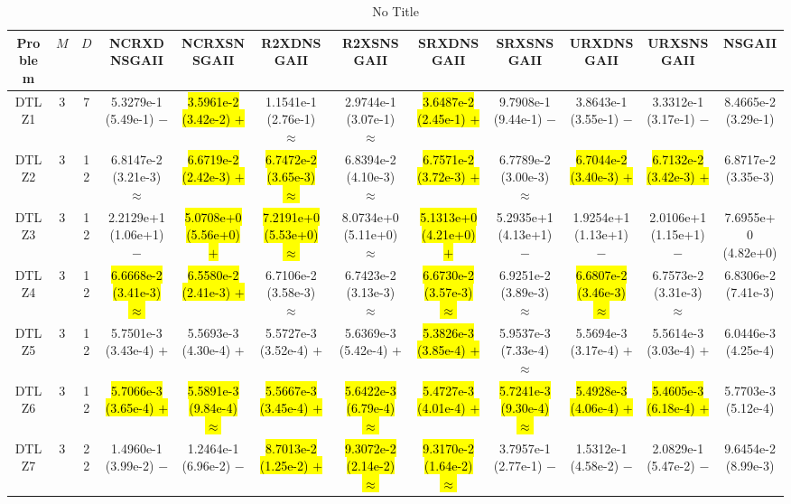 \documentclass[journal]{IEEEtran}
\begin{document}
\begin{table*}[htbp]
\renewcommand{\arraystretch}{1.2}
\centering
\caption{No Title}
\begin{tabular}{cccccccccccc}
\toprule
Problem&$M$&$D$&NCRXDNSGAII&NCRXSNSGAII&R2XDNSGAII&R2XSNSGAII&SRXDNSGAII&SRXSNSGAII&URXDNSGAII&URXSNSGAII&NSGAII\\
\midrule
\multirow{1}{*}{DTLZ1}&3&7&5.3279e-1 (5.49e-1) $-$&\hl{3.5961e-2 (3.42e-2) $+$}&1.1541e-1 (2.76e-1) $\approx$&2.9744e-1 (3.07e-1) $\approx$&\hl{3.6487e-2 (2.45e-1) $+$}&9.7908e-1 (9.44e-1) $-$&3.8643e-1 (3.55e-1) $-$&3.3312e-1 (3.17e-1) $-$&8.4665e-2 (3.29e-1)\\
\hline
\multirow{1}{*}{DTLZ2}&3&12&6.8147e-2 (3.21e-3) $\approx$&\hl{6.6719e-2 (2.42e-3) $+$}&\hl{6.7472e-2 (3.65e-3) $\approx$}&6.8394e-2 (4.10e-3) $\approx$&\hl{6.7571e-2 (3.72e-3) $+$}&6.7789e-2 (3.00e-3) $\approx$&\hl{6.7044e-2 (3.40e-3) $+$}&\hl{6.7132e-2 (3.42e-3) $+$}&6.8717e-2 (3.35e-3)\\
\hline
\multirow{1}{*}{DTLZ3}&3&12&2.2129e+1 (1.06e+1) $-$&\hl{5.0708e+0 (5.56e+0) $+$}&\hl{7.2191e+0 (5.53e+0) $\approx$}&8.0734e+0 (5.11e+0) $\approx$&\hl{5.1313e+0 (4.21e+0) $+$}&5.2935e+1 (4.13e+1) $-$&1.9254e+1 (1.13e+1) $-$&2.0106e+1 (1.15e+1) $-$&7.6955e+0 (4.82e+0)\\
\hline
\multirow{1}{*}{DTLZ4}&3&12&\hl{6.6668e-2 (3.41e-3) $\approx$}&\hl{6.5580e-2 (2.41e-3) $+$}&6.7106e-2 (3.58e-3) $\approx$&6.7423e-2 (3.13e-3) $\approx$&\hl{6.6730e-2 (3.57e-3) $\approx$}&6.9251e-2 (3.89e-3) $\approx$&\hl{6.6807e-2 (3.46e-3) $\approx$}&6.7573e-2 (3.31e-3) $\approx$&6.8306e-2 (7.41e-3)\\
\hline
\multirow{1}{*}{DTLZ5}&3&12&5.7501e-3 (3.43e-4) $+$&5.5693e-3 (4.30e-4) $+$&5.5727e-3 (3.52e-4) $+$&5.6369e-3 (5.42e-4) $+$&\hl{5.3826e-3 (3.85e-4) $+$}&5.9537e-3 (7.33e-4) $\approx$&5.5694e-3 (3.17e-4) $+$&5.5614e-3 (3.03e-4) $+$&6.0446e-3 (4.25e-4)\\
\hline
\multirow{1}{*}{DTLZ6}&3&12&\hl{5.7066e-3 (3.65e-4) $+$}&\hl{5.5891e-3 (9.84e-4) $\approx$}&\hl{5.5667e-3 (3.45e-4) $+$}&\hl{5.6422e-3 (6.79e-4) $\approx$}&\hl{5.4727e-3 (4.01e-4) $+$}&\hl{5.7241e-3 (9.30e-4) $\approx$}&\hl{5.4928e-3 (4.06e-4) $+$}&\hl{5.4605e-3 (6.18e-4) $+$}&5.7703e-3 (5.12e-4)\\
\hline
\multirow{1}{*}{DTLZ7}&3&22&1.4960e-1 (3.99e-2) $-$&1.2464e-1 (6.96e-2) $-$&\hl{8.7013e-2 (1.25e-2) $+$}&\hl{9.3072e-2 (2.14e-2) $\approx$}&\hl{9.3170e-2 (1.64e-2) $\approx$}&3.7957e-1 (2.77e-1) $-$&1.5312e-1 (4.58e-2) $-$&2.0829e-1 (5.47e-2) $-$&9.6454e-2 (8.99e-3)\\

\end{tabular}
\end{table*}
\end{document}
